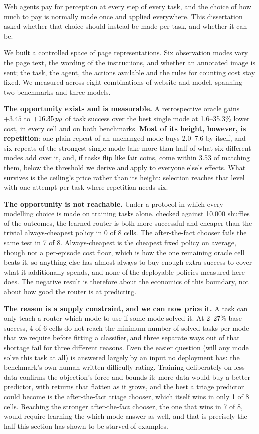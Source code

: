Web agents pay for perception at every step of every task, and the choice of how
much to pay is normally made once and applied everywhere. This dissertation
asked whether that choice should instead be made per task, and whether it can
be.

We built a controlled space of page representations. Six observation modes
vary the page text, the wording of the instructions, and whether an annotated
image is sent; the task, the agent, the actions available and the rules for
counting cost stay fixed. We measured across eight combinations of website and
model, spanning two benchmarks and three models.

\textbf{The opportunity exists and is measurable.} A retrospective oracle gains $+3.45$ to
$+16.35\,pp$ of task success over the best single mode at 1.6--35.3\% lower
cost, in every cell and on both benchmarks. \textbf{Most of its height,
however, is repetition}: one plain repeat of an unchanged mode buys
2.0--7.6\pp{} by itself, and six repeats of the strongest single mode take
more than half of what six different modes add over it, and, if tasks flip
like fair coins, come within 3.53\pp{} of matching them, below the threshold
we derive and apply to everyone else's effects. What survives is the ceiling's
price rather than its height: selection reaches that level with one attempt
per task where repetition needs six.

\textbf{The opportunity is not reachable.} Under a protocol in which every
modelling choice is made on training tasks alone, checked against 10,000
shuffles of the outcomes, the learned router is both more successful and
cheaper than the trivial always-cheapest policy in 0 of 8 cells. The
after-the-fact chooser fails the same test in 7 of 8. Always-cheapest is the
cheapest fixed policy on average, though not a per-episode cost floor, which is
how the one remaining oracle cell beats it, so anything else has almost always to
buy enough extra success to cover what it additionally spends, and none of the
deployable policies measured here does. The negative result is therefore about the economics of this boundary,
not about how good the router is at predicting.

\textbf{The reason is a supply constraint, and we can now price it.} A task
can only teach a router which mode to use if some mode solved it. At 2--27\%
base success, 4 of 6 cells do not reach the minimum number of solved tasks per
mode that we require before fitting a classifier, and three separate ways out
of that shortage fail for three different reasons. Even the easier question
(will any mode solve this task at all) is answered largely by an input
no deployment has: the benchmark's own human-written difficulty rating. Training
deliberately on less data confirms the objection's force and bounds it: more
data would buy a better predictor, with returns that flatten as it grows, and
the best a triage predictor could become is the after-the-fact triage chooser,
which itself wins in only 1 of 8 cells. Reaching the stronger after-the-fact
chooser, the one that wins in 7 of 8, would require learning the which-mode
answer as well, and that is precisely the half this section has shown to be
starved of examples.

